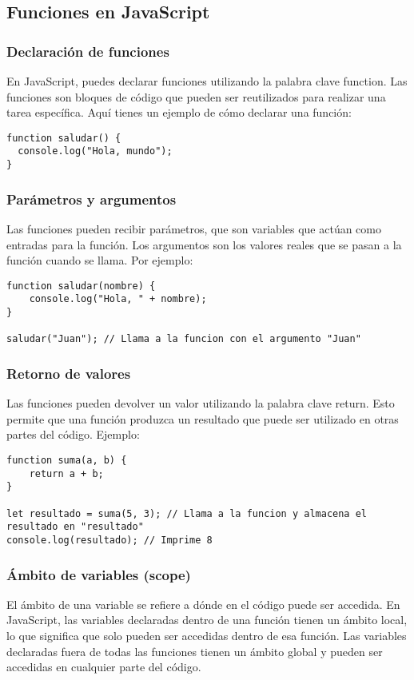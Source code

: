 \documentclass[executivepaper]{article}
\begin{document}
\subsection{Funciones en JavaScript}
\subsubsection*{Declaración de funciones}
En JavaScript, puedes declarar funciones utilizando la palabra clave function. Las funciones son bloques de código que pueden ser reutilizados para realizar una tarea específica. Aquí tienes un ejemplo de cómo declarar una función:

\begin{lstlisting}
function saludar() {
  console.log("Hola, mundo");
}
\end{lstlisting}

\subsubsection*{Parámetros y argumentos}
Las funciones pueden recibir parámetros, que son variables que actúan como entradas para la función. Los argumentos son los valores reales que se pasan a la función cuando se llama. Por ejemplo:

\begin{lstlisting}
function saludar(nombre) {
    console.log("Hola, " + nombre);
}

saludar("Juan"); // Llama a la funcion con el argumento "Juan"
\end{lstlisting}

\subsubsection*{Retorno de valores}
Las funciones pueden devolver un valor utilizando la palabra clave return. Esto permite que una función produzca un resultado que puede ser utilizado en otras partes del código. Ejemplo:

\begin{lstlisting}
function suma(a, b) {
    return a + b;
}

let resultado = suma(5, 3); // Llama a la funcion y almacena el resultado en "resultado"
console.log(resultado); // Imprime 8
\end{lstlisting}

\subsubsection*{Ámbito de variables (scope)}
El ámbito de una variable se refiere a dónde en el código puede ser accedida. En JavaScript, las variables declaradas dentro de una función tienen un ámbito local, lo que significa que solo pueden ser accedidas dentro de esa función. Las variables declaradas fuera de todas las funciones tienen un ámbito global y pueden ser accedidas en cualquier parte del código.
\end{document}
